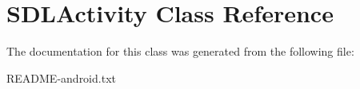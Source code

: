 \hypertarget{classSDLActivity}{}\section{S\+D\+L\+Activity Class Reference}
\label{classSDLActivity}


The documentation for this class was generated from the following file\+:\begin{DoxyCompactItemize}
\item 
R\+E\+A\+D\+M\+E-\/android.\+txt\end{DoxyCompactItemize}
